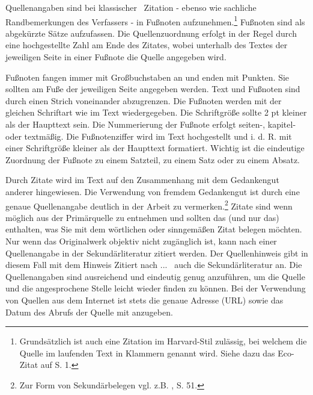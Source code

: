\documentclass[a4paper, 12pt]{article}
\begin{document}
Quellenangaben sind bei \glqq klassischer \grqq\ Zitation - ebenso wie sachliche
Randbemerkungen des Verfassers - in Fu\ss noten aufzunehmen.\footnote{Grunds\"{a}tzlich ist
auch eine Zitation im Harvard-Stil zul\"{a}ssig, bei welchem die Quelle im laufenden
Text in Klammern genannt wird. Siehe dazu das Eco-Zitat auf S. 1.} Fu\ss noten sind als
abgek\"{u}rzte S\"{a}tze aufzufassen. Die Quellenzuordnung erfolgt in der Regel durch eine
hochgestellte Zahl am Ende des Zitates, wobei unterhalb des Textes der jeweiligen
Seite in einer Fu\ss note die Quelle angegeben wird.

Fu\ss noten fangen immer mit Gro\ss buchstaben an und enden mit Punkten. Sie sollten am
Fu\ss e der jeweiligen Seite angegeben werden. Text und Fu\ss noten sind durch einen
Strich voneinander abzugrenzen. Die Fu\ss noten werden mit der gleichen Schriftart wie
im Text wiedergegeben. Die Schriftgr\"{o}\ss e sollte 2 pt kleiner als der Haupttext sein.
Die Nummerierung der Fu\ss note erfolgt seiten-, kapitel- oder textm\"{a}\ss ig. Die
Fu\ss notenziffer wird im Text hochgestellt und i. d. R. mit einer Schriftgr\"{o}\ss e kleiner
als der Haupttext formatiert. Wichtig ist die eindeutige Zuordnung der Fu\ss note zu
einem Satzteil, zu einem Satz oder zu einem Absatz.

Durch Zitate wird im Text auf den Zusammenhang mit dem Gedankengut anderer
hingewiesen. Die Verwendung von fremdem Gedankengut ist durch eine genaue
Quellenangabe deutlich in der Arbeit zu vermerken.\footnote{Zur Form von
Sekund\"{a}rbelegen vgl. z.B. \cite{bae1996}, S. 51.}  Zitate sind   wenn m\"{o}glich aus
der Prim\"{a}rquelle zu entnehmen und sollten das (und nur das) enthalten, was Sie mit
dem w\"{o}rtlichen oder sinngem\"{a}\ss en Zitat belegen m\"{o}chten. Nur wenn das Originalwerk
objektiv nicht zug\"{a}nglich ist, kann nach einer Quellenangabe in der
Sekund\"{a}rliteratur zitiert werden. Der Quellenhinweis gibt in diesem Fall mit dem
Hinweis \glqq Zitiert nach ... \grqq\ auch die Sekund\"{a}rliteratur an. Die
Quellenangaben sind ausreichend und eindeutig genug anzuf\"{u}hren, um die Quelle und
die angesprochene Stelle leicht wieder finden zu k\"{o}nnen. Bei der Verwendung von
Quellen aus dem Internet ist stets die genaue Adresse (URL) sowie das Datum des
Abrufs der Quelle mit anzugeben.
\end{document}
